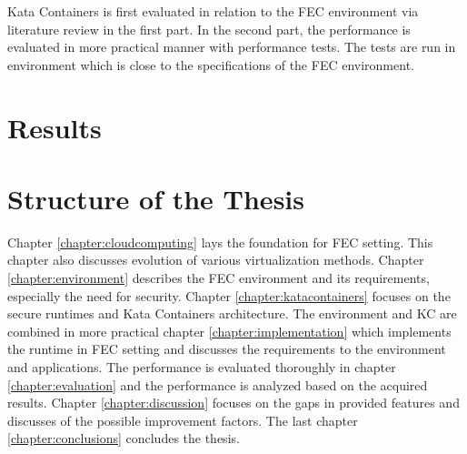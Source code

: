 Kata Containers is first evaluated in relation to the FEC environment via literature review in the first part. In the second part, the performance is evaluated in more practical manner with performance tests. The tests are run in environment which is close to the specifications of the FEC environment.

\section{Results}
\label{section:intro_results}


\section{Structure of the Thesis}
\label{section:intro_structure}

Chapter \ref{chapter:cloudcomputing} lays the foundation for FEC setting. This chapter also discusses evolution of various virtualization methods. Chapter \ref{chapter:environment} describes the FEC environment and its requirements, especially the need for security. Chapter \ref{chapter:katacontainers} focuses on the secure runtimes and Kata Containers architecture. The environment and KC are combined in more practical chapter \ref{chapter:implementation} which implements the runtime in FEC setting and discusses the requirements to the environment and applications. The performance is evaluated thoroughly in chapter \ref{chapter:evaluation} and the performance is analyzed based on the acquired results. Chapter \ref{chapter:discussion} focuses on the gaps in provided features and discusses of the possible improvement factors. The last chapter \ref{chapter:conclusions} concludes the thesis.


